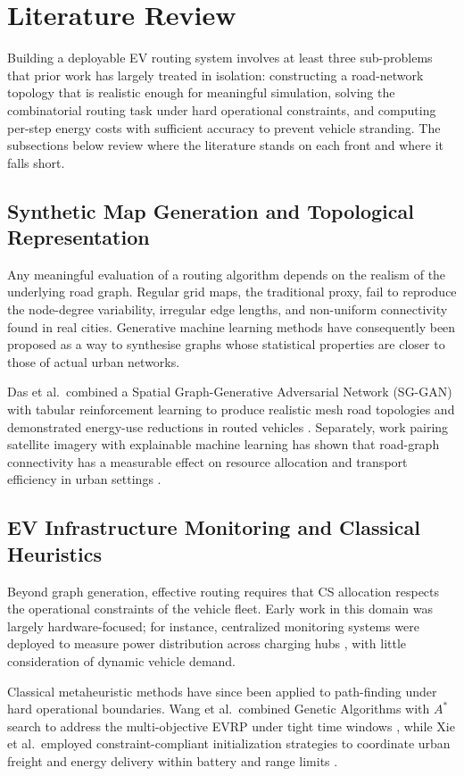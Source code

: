 \documentclass[conference]{IEEEtran}
\begin{document}
\section{Literature Review}\label{II}

Building a deployable EV routing system involves at least three sub-problems that prior work has largely treated in isolation: constructing a road-network topology that is realistic enough for meaningful simulation, solving the combinatorial routing task under hard operational constraints, and computing per-step energy costs with sufficient accuracy to prevent vehicle stranding. The subsections below review where the literature stands on each front and where it falls short.

\subsection{Synthetic Map Generation and Topological Representation}
Any meaningful evaluation of a routing algorithm depends on the realism of the underlying road graph. Regular grid maps, the traditional proxy, fail to reproduce the node-degree variability, irregular edge lengths, and non-uniform connectivity found in real cities. Generative machine learning methods have consequently been proposed as a way to synthesise graphs whose statistical properties are closer to those of actual urban networks.

Das et al.\ combined a Spatial Graph-Generative Adversarial Network (SG-GAN) with tabular reinforcement learning to produce realistic mesh road topologies and demonstrated energy-use reductions in routed vehicles \cite{b4}. Separately, work pairing satellite imagery with explainable machine learning has shown that road-graph connectivity has a measurable effect on resource allocation and transport efficiency in urban settings \cite{b5}.

\subsection{EV Infrastructure Monitoring and Classical Heuristics}
Beyond graph generation, effective routing requires that CS allocation respects the operational constraints of the vehicle fleet. Early work in this domain was largely hardware-focused; for instance, centralized monitoring systems were deployed to measure power distribution across charging hubs \cite{b6}, with little consideration of dynamic vehicle demand.

Classical metaheuristic methods have since been applied to path-finding under hard operational boundaries. Wang et al.\ combined Genetic Algorithms with $A^*$ search to address the multi-objective EVRP under tight time windows \cite{b7}, while Xie et al.\ employed constraint-compliant initialization strategies to coordinate urban freight and energy delivery within battery and range limits \cite{b8}.
\end{document}
